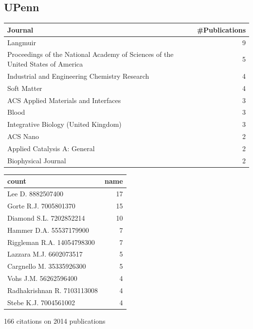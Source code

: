 \documentclass[11pt]{article}
\begin{document}
\subsection{UPenn}
\label{sec-1-17}
\begin{center}
\begin{tabular}{lr}
Journal & \#Publications\\
\hline
Langmuir & 9\\
Proceedings of the National Academy of Sciences of the United States of America & 5\\
Industrial and Engineering Chemistry Research & 4\\
Soft Matter & 4\\
ACS Applied Materials and Interfaces & 3\\
Blood & 3\\
Integrative Biology (United Kingdom) & 3\\
ACS Nano & 2\\
Applied Catalysis A: General & 2\\
Biophysical Journal & 2\\
\end{tabular}
\end{center}

\begin{center}
\begin{tabular}{lr}
count & name\\
\hline
Lee D. 8882507400 & 17\\
Gorte R.J. 7005801370 & 15\\
Diamond S.L. 7202852214 & 10\\
Hammer D.A. 55537179900 & 7\\
Riggleman R.A. 14054798300 & 7\\
Lazzara M.J. 6602073517 & 5\\
Cargnello M. 35335926300 & 5\\
Vohs J.M. 56262596400 & 4\\
Radhakrishnan R. 7103113008 & 4\\
Stebe K.J. 7004561002 & 4\\
\end{tabular}
\end{center}

166 citations on 2014 publications
\end{document}
